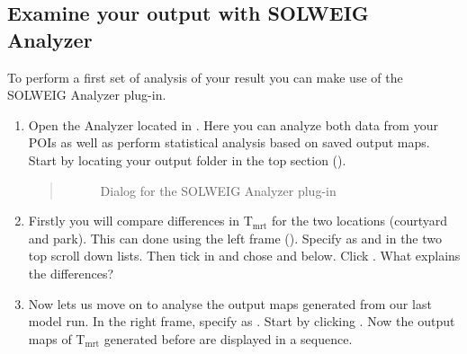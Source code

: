 \documentclass[letterpaper,10pt,english]{sphinxmanual}
\let\sphinxpxdimen\pdfpxdimen\else\newdimen\sphinxpxdimen
\begin{document}
\subsection{Examine your output with SOLWEIG Analyzer}
\label{\detokenize{Tutorials/IntroductionToSolweig:examine-your-output-with-solweig-analyzer}}
To perform a first set of analysis of your result you can make use of
the SOLWEIG Analyzer plug-in.
\begin{enumerate}
\item {} 
Open the Analyzer located in . Here you can analyze both data
from your POIs as well as perform statistical analysis based on saved
output maps. Start by locating your output folder in the top section
().
\begin{quote}

\begin{figure}[htbp]
\centering
\capstart

\noindent\sphinxincludegraphics[width=875\sphinxpxdimen]{{SOLWEIG_SOLWEIGAnalyzer}.png}
\caption{Dialog for the SOLWEIG Analyzer plug-in}\label{\detokenize{Tutorials/IntroductionToSolweig:id9}}\end{figure}
\end{quote}

\item {} 
Firstly you will compare differences in T$_{\text{mrt}}$ for the two
locations (courtyard and park). This can done using the left frame
(). Specify  as  and  in the two top scroll down lists. Then tick in
 and chose  and  below. Click . What explains the differences?

\item {} 
Now lets us move on to analyse the output maps generated from our
last model run. In the right frame, specify  as . Start by clicking . Now the output maps of T$_{\text{mrt}}$ generated before are
displayed in a sequence.


\end{enumerate}
\end{document}
